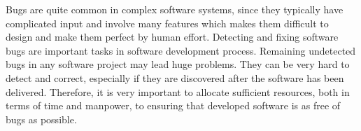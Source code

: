 Bugs are quite common  in complex software systems,
since they typically have complicated input and involve many features which makes them difficult to design and make them perfect by human effort.
%
Detecting and fixing software bugs are important tasks in software development process. Remaining undetected bugs in any software project may lead huge
problems. They can be very hard to detect and correct, %
 especially if they are discovered after the software has been delivered.
Therefore, it is very important to allocate sufficient
resources, both in terms of time and manpower, to ensuring that developed
software is as free of bugs as possible.

%
%
%

